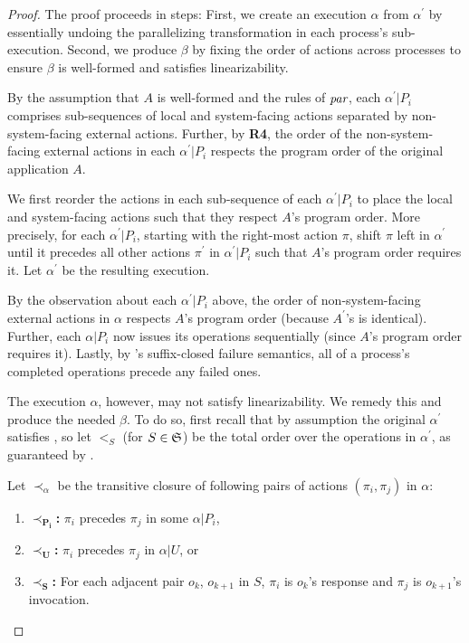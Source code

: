 \begin{proof}
The proof proceeds in steps: First, we create an execution $\alpha$ from
$\alpha^\prime$ by essentially undoing the parallelizing transformation in
each process's sub-execution. Second, we produce $\beta$ by fixing the order
of actions across processes to ensure $\beta$ is well-formed and satisfies linearizability.

By the assumption that $A$ is well-formed and the rules of $\operatorname*{\textit{par}}$,
each $\alpha^\prime | P_i$ comprises sub-sequences of local and
system-facing actions separated by non-system-facing external actions.
Further, by \textbf{R4}, the order of the non-system-facing external
actions in each $\alpha^\prime | P_i$ respects the program order of the
original application $A$. 

We first reorder the actions in each sub-sequence of each $\alpha^\prime | P_i$
to place the local and system-facing actions such that they respect $A$'s program
order. More precisely, for each $\alpha^\prime | P_i$, starting with the right-most
action $\pi$, shift $\pi$ left in $\alpha^\prime$ until it precedes
all other actions $\pi^\prime$ in $\alpha^\prime | P_i$ such that $A$'s program
order requires it. Let $\alpha^\prime$ be the resulting execution.

By the observation about each $\alpha^\prime | P_i$ above, the order of
non-system-facing external actions in $\alpha$ respects $A$'s program order
(because $A^\prime$'s is identical). Further, each $\alpha | P_i$ now
issues its operations sequentially (since $A$'s program order requires it).
Lastly, by \MDL{}'s suffix-closed failure semantics, all of a process's 
completed operations precede any failed ones.

The execution $\alpha$, however, may not satisfy linearizability. We remedy this
and produce the needed $\beta$. To do so, first recall that by assumption the 
original  $\alpha^\prime$ satisfies \MDL{}, so let $<_S$ (for $S \in \mathfrak{S}$) be the total order over the operations in $\alpha^\prime$, as guaranteed by \MDL{}.

Let $\prec_{\alpha}$ be the transitive closure of following pairs of actions
$(\pi_i, \pi_j)$ in $\alpha$:
\begin{enumerate}
    \item $\mathbf{\prec_{P_i}}$\textbf{:} $\pi_i$ precedes $\pi_j$ in some $\alpha | P_i$,
    \item $\mathbf{\prec_U}$\textbf{:} $\pi_i$ precedes $\pi_j$ in $\alpha | U$, or
    \item $\mathbf{\prec_S}$\textbf{:} For each adjacent pair $o_k$, $o_{k+1}$
    in $S$, $\pi_i$ is $o_k$'s response and $\pi_j$ is $o_{k+1}$'s invocation.
\end{enumerate}


\end{proof}
